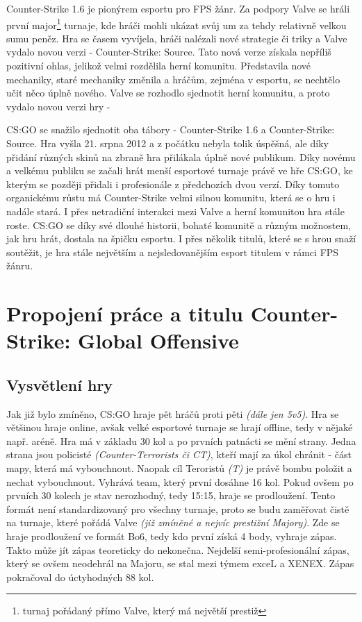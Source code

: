 Counter-Strike 1.6 je pionýrem esportu pro \ac{FPS} žánr. Za podpory Valve se hráli první major\footnote{turnaj pořádaný přímo Valve, který má největší prestiž} turnaje, kde hráči mohli ukázat svůj um za tehdy relativně velkou
sumu peněz. Hra se časem vyvíjela, hráči nalézali nové strategie či triky a Valve vydalo novou verzi - Counter-Strike: Source. Tato nová verze získala nepříliš pozitivní ohlas, jelikož velmi rozdělila herní komunitu. Představila 
nové mechaniky, staré mechaniky změnila a hráčům, zejména v esportu, se nechtělo učit něco úplně nového. Valve se rozhodlo sjednotit herní komunitu, a proto vydalo novou verzi hry - 

\ac{CS:GO} se snažilo sjednotit oba tábory - Counter-Strike 1.6 a Counter-Strike: Source. Hra vyšla 21. srpna 2012 a z počátku nebyla tolik úspěšná, ale díky přidání různých skinů\cite{Valve2013} na zbraně hra přilákala
úplně nové publikum. Díky novému a velkému publiku se začali hrát menší esportové turnaje právě ve hře \ac{CS:GO}, ke kterým se později přidali i profesionále z předchozích dvou verzí. Díky tomuto organickému růstu má
Counter-Strike velmi silnou komunitu, která se o hru i nadále stará. I přes netradiční interakci mezi Valve a herní komunitou hra stále roste. \ac{CS:GO} se díky své dlouhé historii, bohaté komunitě a různým možnostem,
jak hru hrát, dostala na špičku esportu. I přes několik titulů, které se s hrou snaží soutěžit, je hra stále největším a nejsledovanějším esport titulem v rámci \ac{FPS} žánru\cite{Henningson2020}.

\section{Propojení práce a titulu Counter-Strike: Global Offensive}
\subsection{Vysvětlení hry}
Jak již bylo zmíněno, \ac{CS:GO} hraje pět hráčů proti pěti \textit{(dále jen 5v5)}. Hra se většinou hraje online, avšak velké esportové turnaje se hrají offline, tedy v nějaké např. aréně. Hra má v základu 30 kol a po 
prvních patnácti se mění strany. Jedna strana jsou policisté \textit{(Counter-Terrorists či CT)}, kteří mají za úkol chránit  - část mapy, která má vybouchnout. Naopak cíl Teroristů \textit{(T)} je právě
bombu položit a  nechat vybouchnout. Vyhrává team, který první dosáhne 16 kol. Pokud ovšem po prvních 30 kolech je stav nerozhodný, tedy 15:15, hraje se prodloužení. Tento formát není standardizovaný pro
všechny turnaje, proto se budu zaměřovat čistě na turnaje, které pořádá Valve \textit{(již zmíněné a nejvíc prestižní Majory)}. Zde se hraje prodloužení ve formát Bo6, tedy kdo první získá 4 body, vyhraje zápas. Takto 
může jít zápas teoreticky do nekonečna. Nejdelší semi-profesionální zápas, který se ovšem neodehrál na Majoru, se stal mezi týmem exceL a XENEX\cite{hltv.org2015}. Zápas pokračoval do úctyhodných 88 kol.

